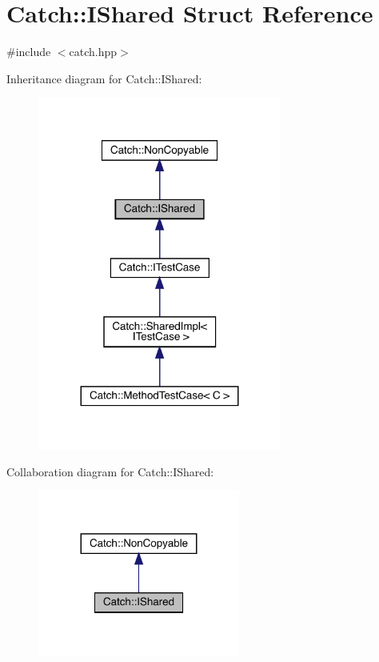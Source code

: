 \hypertarget{struct_catch_1_1_i_shared}{}\section{Catch\+:\+:I\+Shared Struct Reference}
\label{struct_catch_1_1_i_shared}


{\ttfamily \#include $<$catch.\+hpp$>$}



Inheritance diagram for Catch\+:\+:I\+Shared\+:
\nopagebreak
\begin{figure}[H]
\begin{center}
\leavevmode
\includegraphics[width=227pt]{struct_catch_1_1_i_shared__inherit__graph}
\end{center}
\end{figure}


Collaboration diagram for Catch\+:\+:I\+Shared\+:
\nopagebreak
\begin{figure}[H]
\begin{center}
\leavevmode
\includegraphics[width=188pt]{struct_catch_1_1_i_shared__coll__graph}
\end{center}
\end{figure}
